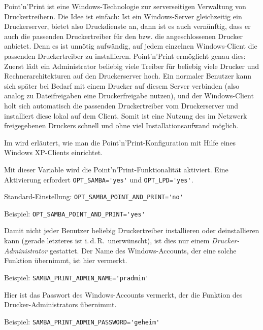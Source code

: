 
Point'n'Print ist eine Windows-Technologie zur serverseitigen Verwaltung von
Druckertreibern. Die Idee ist einfach: Ist ein Windows-Server gleichzeitig ein
Druckerserver, bietet also Druckdienste an, dann ist es auch vernünftig, dass
er auch die passenden Druckertreiber für den bzw. die angeschlossenen Drucker
anbietet. Denn es ist unnötig aufwändig, auf jedem einzelnen Windows-Client die
passenden Druckertreiber zu installieren. Point'n'Print ermöglicht genau dies:
Zuerst lädt ein Administrator beliebig viele Treiber für beliebig viele Drucker
und Rechnerarchitekturen auf den Druckerserver hoch. Ein normaler Benutzer kann
sich später bei Bedarf mit einem Drucker auf diesem Server verbinden (also
analog zu Dateifreigaben eine Druckerfreigabe nutzen), und der Windows-Client
holt sich automatisch die passenden Druckertreiber vom Druckerserver und
installiert diese lokal auf dem Client. Somit ist eine Nutzung des im Netzwerk
freigegebenen Druckers schnell und ohne viel Installationsaufwand möglich.

Im  wird erläutert, wie man die
Point'n'Print-Konfiguration mit Hilfe eines Windows XP-Clients einrichtet.

\begin{description}


Mit dieser Variable wird die Point'n'Print-Funktio\-nalität aktiviert. Eine
Aktivierung erfordert \verb+OPT_SAMBA='yes'+ und \verb+OPT_LPD='yes'+.

Standard-Einstellung: \verb+OPT_SAMBA_POINT_AND_PRINT='no'+

Beispiel: \verb+OPT_SAMBA_POINT_AND_PRINT='yes'+


Damit nicht jeder Benutzer beliebig Druckertreiber installieren oder
deinstallieren kann (gerade letzteres ist i.\,d.\,R.\ unerwünscht), ist dies
nur einem \emph{Drucker-Administrator} gestattet. Der Name des Windows-Accounts,
der eine solche Funktion übernimmt, ist hier vermerkt.

Beispiel: \verb+SAMBA_PRINT_ADMIN_NAME='pradmin'+


Hier ist das Passwort des Windows-Accounts vermerkt, der die Funktion des
Drucker-Administrators übernimmt.

Beispiel: \verb+SAMBA_PRINT_ADMIN_PASSWORD='geheim'+

\end{description}

